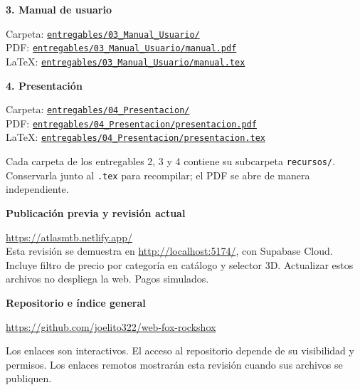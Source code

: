 \documentclass[11pt,a4paper]{article}
\newcommand{\repo}{https://github.com/joelito322/web-fox-rockshox}
\begin{document}
{\bfseries 3. Manual de usuario}\par
{\small Carpeta: \href{\repo/tree/main/entregables/03_Manual_Usuario}{\nolinkurl{entregables/03_Manual_Usuario/}}\\
PDF: \href{\repo/blob/main/entregables/03_Manual_Usuario/manual.pdf}{\nolinkurl{entregables/03_Manual_Usuario/manual.pdf}}\\
LaTeX: \href{\repo/blob/main/entregables/03_Manual_Usuario/manual.tex}{\nolinkurl{entregables/03_Manual_Usuario/manual.tex}}}

{\bfseries 4. Presentación}\par
{\small Carpeta: \href{\repo/tree/main/entregables/04_Presentacion}{\nolinkurl{entregables/04_Presentacion/}}\\
PDF: \href{\repo/blob/main/entregables/04_Presentacion/presentacion.pdf}{\nolinkurl{entregables/04_Presentacion/presentacion.pdf}}\\
LaTeX: \href{\repo/blob/main/entregables/04_Presentacion/presentacion.tex}{\nolinkurl{entregables/04_Presentacion/presentacion.tex}}}

{\small Cada carpeta de los entregables 2, 3 y 4 contiene su subcarpeta \texttt{recursos/}. Conservarla junto al \texttt{.tex} para recompilar; el PDF se abre de manera independiente.}

\vspace{8pt}
{\large\bfseries Publicación previa y revisión actual}\par
\url{https://atlasmtb.netlify.app/}\\
{\small Esta revisión se demuestra en \url{http://localhost:5174/}, con Supabase Cloud. Incluye filtro de precio por categoría en catálogo y selector 3D. Actualizar estos archivos no despliega la web. Pagos simulados.}

{\large\bfseries Repositorio e índice general}\par
\url{https://github.com/joelito322/web-fox-rockshox}

\vfill
{\small Los enlaces son interactivos. El acceso al repositorio depende de su visibilidad y permisos. Los enlaces remotos mostrarán esta revisión cuando sus archivos se publiquen.}
\end{document}
